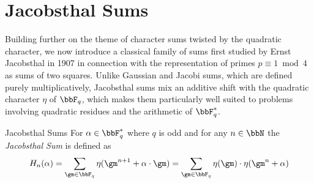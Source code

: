 \section{Jacobsthal Sums}
Building further on the theme of character sums twisted by the quadratic character, we now introduce a classical family of sums first studied by Ernst Jacobsthal in 1907 in connection with the representation of primes $p\equiv 1\bmod 4$ as sums of two squares. Unlike Gaussian and Jacobi sums, which are defined purely multiplicatively, Jacobsthal sums mix an additive shift with the quadratic character $\eta$ of $\bbF_q$, which makes them particularly well suited to problems involving quadratic residues and the arithmetic of $\bbF_q^*$.
\begin{Definition}{Jacobsthal Sums}{}
  For $\alpha\in\bbF_q^*$ where $q$ is odd and for any $n\in\bbN$ the \emph{Jacobsthal Sum} is defined as $$H_n(\alpha)=\sum_{\gm\in\bbF_q}\eta(\gm^{n+1}+\alpha\cdot \gm)=\sum_{\gm\in\bbF_q}\eta(\gm)\cdot \eta(\gm^n+\alpha)$$
\end{Definition}